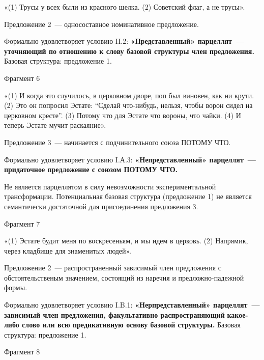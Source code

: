 \documentclass{kursa4}
\begin{document}
    {\color[rgb]{0.2,0.2,0.2}
    «(1) Трусы у всех были из красного шелка. (2) Советский флаг, а не
    трусы».}

    {\color[rgb]{0.2,0.2,0.2}
    Предложение 2~--- односоставное номинативное предложение. }

    {\color[rgb]{0.2,0.2,0.2}
    Формально удовлетворяет условию II.2: \textbf{«Представленный»
    парцеллят~--- уточняющий по отношению к слову базовой структуры член
    предложения. }Базовая структура: предложение 1. }


    \bigskip

    {\color[rgb]{0.2,0.2,0.2}
    Фрагмент 6}

    {\color[rgb]{0.2,0.2,0.2}
    «(1) И когда это случилось, в церковном дворе, поп был виновен, как
    ни крути. (2) Это он попросил Эстате: “Сделай что-нибудь, нельзя, чтобы
    ворон сидел на церковном кресте”. (3) Потому что для Эстате что вороны,
    что чайки. (4) И теперь Эстате мучит раскаяние». }

    {\color[rgb]{0.2,0.2,0.2}
    Предложение 3~--- начинается с подчинительного союза ПОТОМУ ЧТО. }

    {\color[rgb]{0.2,0.2,0.2}
    Формально удовлетворяет условию I.А.3: \textbf{«Непредставленный»
    парцеллят~--- придаточное предложение с союзом ПОТОМУ ЧТО.} }

    {\color[rgb]{0.2,0.2,0.2}
    Не является парцеллятом в силу невозможности экспериментальной
    трансформации. Потенциальная базовая структура (предложение 1) не
    является семантически достаточной для присоединения предложения 3. }

    {\color[rgb]{0.2,0.2,0.2}
    Фрагмент 7}

    {\color[rgb]{0.2,0.2,0.2}
    «(1) Эстате будит меня по воскресеньям, и мы идем в церковь. (2)
    Напрямик, через кладбище для знаменитых людей».}

    {\color[rgb]{0.2,0.2,0.2}
    Предложение 2~--- распространенный зависимый член предложения с
    обстоятельственым значением, состоящий из наречия и предложно-падежной
    формы. }

    {\color[rgb]{0.2,0.2,0.2}
    Формально удовлетворяет условию I.B.1:
    \textbf{«}\textbf{Нерпредставленный» парцеллят~--- зависимый член
    предложения, факультативно распространяющий }\textbf{какое-либо слово
    или всю предикативную основу базовой структуры. }Базовая структура:
    предложение 1.}

    {\color[rgb]{0.2,0.2,0.2}
    Фрагмент 8}
\end{document}
